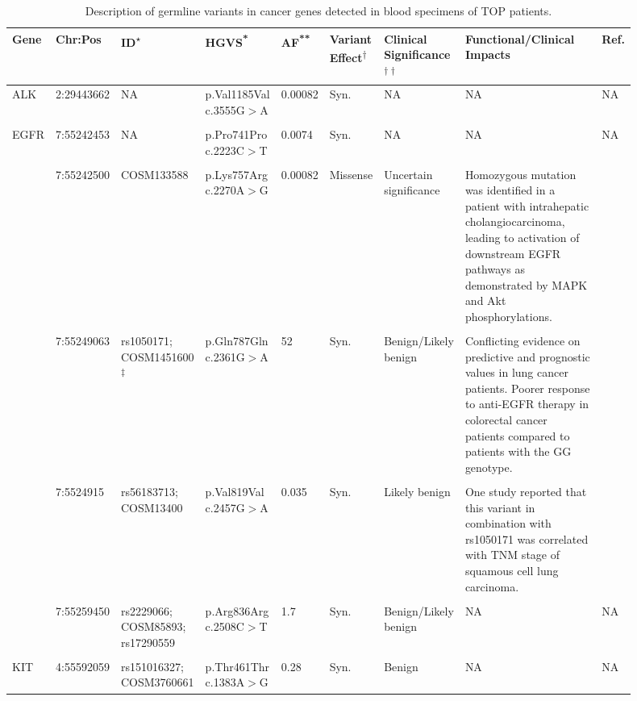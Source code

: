 \begin{landscape}

\begin{longtable}{p{0.07\linewidth}|p{0.09\linewidth}p{0.11\linewidth}p{0.1\linewidth}p{0.05\linewidth}p{0.065\linewidth}p{0.11\linewidth}p{0.25\linewidth}p{0.05\linewidth}}
		\caption{Description of germline variants in cancer genes detected in blood specimens of TOP patients.}
    \label{tbl:germline_cancer_genes}
		\\
    \hline
    Gene & Chr:Pos & ID\textsuperscript{$\star$} & HGVS\textsuperscript{*} & AF\textsuperscript{**} & Variant Effect\textsuperscript{$\dagger$} & Clinical Significance\textsuperscript{$\dagger\dagger$} & Functional/Clinical Impacts & Ref.
		\\
    \hline
		ALK & 2:29443662 & NA & p.Val1185Val c.3555G$>$A & 0.00082 & Syn. & NA & NA & NA
		\\
		\\
		\hline
		EGFR & 7:55242453 & NA & p.Pro741Pro c.2223C$>$T & 0.0074 & Syn. & NA & NA & NA
		\\
		\\
		& 7:55242500 & COSM133588 & p.Lys757Arg c.2270A$>$G & 0.00082 & Missense & Uncertain \mbox{significance} & Homozygous mutation was identified in a patient with intrahepatic cholangiocarcinoma, leading to activation of downstream EGFR pathways as demonstrated by MAPK and Akt phosphorylations. & \cite{Leone2006}
		\\
		\\
		& 7:55249063 & rs1050171; COSM1451600\textsuperscript{$\ddagger$} & p.Gln787Gln c.2361G$>$A & 52 & Syn. & Benign/Likely benign & Conflicting evidence on predictive and prognostic values in lung cancer patients. Poorer response to anti-EGFR therapy in colorectal cancer patients compared to patients with the GG genotype. & \cite{Zhang2006a, Leichsenring2017, Wang2013, Bonin2016}
		\\
		\\
		& 7:5524915 & rs56183713; COSM13400 & p.Val819Val c.2457G$>$A & 0.035 & Syn. & Likely benign & One study reported that this variant in combination with rs1050171 was correlated with TNM stage of squamous cell lung carcinoma. & \cite{Wang2013}
		\\
		\\
		& 7:55259450 & rs2229066; COSM85893; rs17290559 & p.Arg836Arg c.2508C$>$T & 1.7 & Syn. & Benign/Likely benign & NA & NA
		\\
		\\
    \hline
		KIT & 4:55592059 & rs151016327; COSM3760661 & p.Thr461Thr c.1383A$>$G & 0.28 & Syn. & Benign & NA & NA

\end{longtable}
\end{landscape}
